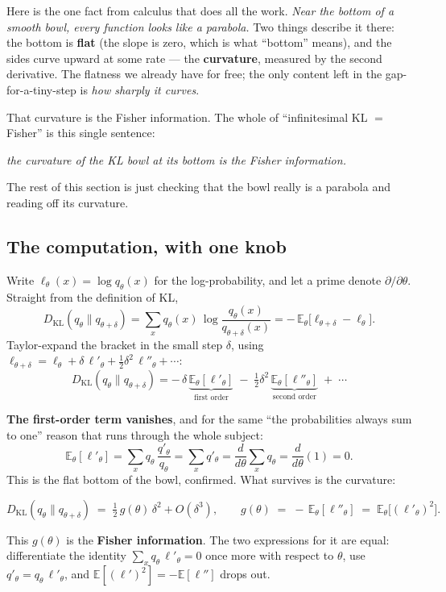\documentclass[11pt]{article}
\begin{document}
Here is the one fact from calculus that does all the work. \emph{Near the bottom of a smooth
bowl, every function looks like a parabola.} Two things describe it there: the bottom is
\textbf{flat} (the slope is zero, which is what ``bottom'' means), and the sides curve upward at
some rate --- the \textbf{curvature}, measured by the second derivative. The flatness we already
have for free; the only content left in the gap-for-a-tiny-step is \emph{how sharply it curves}.

That curvature is the Fisher information. The whole of ``infinitesimal KL $=$ Fisher'' is this
single sentence:
\begin{center}
\emph{the curvature of the KL bowl at its bottom is the Fisher information.}
\end{center}
The rest of this section is just checking that the bowl really is a parabola and reading off its
curvature.

\subsection*{The computation, with one knob}

Write $\ell_\theta(x) = \log q_\theta(x)$ for the log-probability, and let a prime denote
$\partial/\partial\theta$. Straight from the definition of KL,
\[
  D_{\mathrm{KL}}(q_\theta \| q_{\theta+\delta})
    = \sum_x q_\theta(x)\,\log\frac{q_\theta(x)}{q_{\theta+\delta}(x)}
    = -\,\mathbb{E}_\theta\big[\ell_{\theta+\delta} - \ell_\theta\big].
\]
Taylor-expand the bracket in the small step $\delta$, using
$\ell_{\theta+\delta} = \ell_\theta + \delta\,\ell'_\theta + \tfrac12\delta^2\,\ell''_\theta +
\cdots$:
\[
  D_{\mathrm{KL}}(q_\theta \| q_{\theta+\delta})
    = -\,\delta\,\underbrace{\mathbb{E}_\theta[\ell'_\theta]}_{\text{first order}}
      \;-\;\tfrac12\delta^2\,\underbrace{\mathbb{E}_\theta[\ell''_\theta]}_{\text{second order}}
      \;+\;\cdots
\]

\textbf{The first-order term vanishes}, and for the same ``the probabilities always sum to one''
reason that runs through the whole subject:
\[
  \mathbb{E}_\theta[\ell'_\theta]
    = \sum_x q_\theta\,\frac{q'_\theta}{q_\theta}
    = \sum_x q'_\theta
    = \frac{d}{d\theta}\sum_x q_\theta
    = \frac{d}{d\theta}(1)
    = 0.
\]
This is the flat bottom of the bowl, confirmed. What survives is the curvature:
\begin{summary}
\[
  D_{\mathrm{KL}}(q_\theta \| q_{\theta+\delta}) \;=\; \tfrac12\,g(\theta)\,\delta^2 + O(\delta^3),
  \qquad
  g(\theta) \;=\; -\,\mathbb{E}_\theta[\ell''_\theta] \;=\; \mathbb{E}_\theta\big[(\ell'_\theta)^2\big].
\]
\end{summary}
This $g(\theta)$ is the \textbf{Fisher information}. The two expressions for it are equal:
differentiate the identity $\sum_x q_\theta\,\ell'_\theta = 0$ once more with respect to
$\theta$, use $q'_\theta = q_\theta\,\ell'_\theta$, and
$\mathbb{E}[(\ell')^2] = -\mathbb{E}[\ell'']$ drops out.
\end{document}
